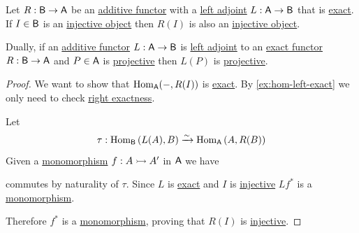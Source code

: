 \documentclass[../../../main]{subfiles}
\begin{document}
\begin{proposition} \label{prop:left-adjoints-and-injectives}
  Let \(R: \mathsf{B} \to \mathsf{A}\) be an \hyperref[def:additive-functor]{additive functor} with a \hyperref[def:adjoint-functors]{left adjoint} \(L: \mathsf{A} \to \mathsf{B}\) that is \hyperref[def:exact-complex-functor]{exact}.
  If \(I \in \mathsf{B}\) is an \hyperref[def:injective-projective-object]{injective object} then \(R(I)\) is also an \hyperref[def:injective-projective-object]{injective object}.

  Dually, if an \hyperref[def:additive-functor]{additive functor} \(L: \mathsf{A} \to \mathsf{B}\) is \hyperref[def:adjoint-functors]{left adjoint} to an \hyperref[def:exact-complex-functor]{exact functor} \(R: \mathsf{B} \to \mathsf{A}\) and \(P \in \mathsf{A}\) is \hyperref[def:injective-projective-object]{projective} then \(L(P)\) is \hyperref[def:injective-projective-object]{projective}.
\end{proposition}
\begin{proof}
  We want to show that \(\operatorname{Hom}_{\mathsf{A}}(-, R(I))\) is \hyperref[def:exact-complex-functor]{exact}.
  By \autoref{ex:hom-left-exact} we only need to check \hyperref[def:exact-complex-functor]{right exactness}.
  
  Let
  \begin{equation*}
    \tau: \operatorname{Hom}_{\mathsf{B}} \left( L(A), B \right) \xrightarrow{\sim} \operatorname{Hom}_{\mathsf{A}} \left( A, R(B) \right)
  \end{equation*}
  Given a \hyperref[def:mono-epi-morphism]{monomorphism} \(f: A \rightarrowtail A'\) in \(\mathsf{A}\) we have
  \begin{center}
  \end{center}
  commutes by naturality of \(\tau\).
  Since \(L\) is \hyperref[def:exact-complex]{exact} and \(I\) is \hyperref[def:injective-projective-object]{injective} \(Lf^{\ast}\) is a \hyperref[def:mono-epi-morphism]{monomorphism}.

  Therefore \(f^{\ast}\) is a \hyperref[def:mono-epi-morphism]{monomorphism}, proving that \(R(I)\) is \hyperref[def:injective-projective-object]{injective}.
\end{proof}
\end{document}
